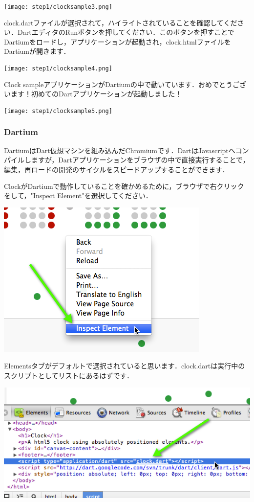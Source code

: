 \texttt{[image: step1/clocksample3.png]}

clock.dartファイルが選択されて，ハイライトされていることを確認してください．DartエディタのRunボタンを押してください．このボタンを押すことでDartiumをロードし，アプリケーションが起動され，clock.htmlファイルをDartiumが開きます．

\texttt{[image: step1/clocksample4.png]}

Clock sampleアプリケーションがDartiumの中で動いています．おめでとうございます！初めてのDartアプリケーションが起動しました！

\texttt{[image: step1/clocksample5.png]}

\subsubsection{Dartium}

DartiumはDart仮想マシンを組み込んだChromiumです．DartはJavascriptへコンパイルしますが，Dartアプリケーションをブラウザの中で直接実行することで，編集，再ロードの開発のサイクルをスピードアップすることができます．

ClockがDartiumで動作していることを確かめるために，ブラウザで右クリックをして，"Inspect Element"を選択してください．

\includegraphics{step1/dartium_img1.png}

Elementsタブがデフォルトで選択されていると思います．clock.dartは実行中のスクリプトとしてリストにあるはずです．

\includegraphics{step1/dartium_img2.png}

